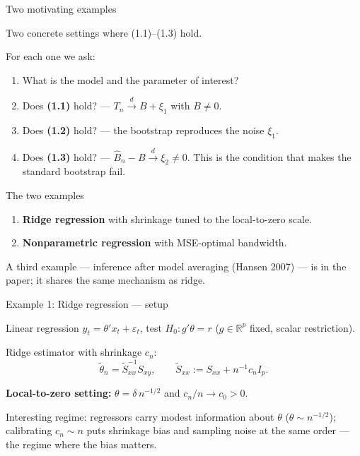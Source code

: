 \documentclass[10pt,aspectratio=169]{beamer}
\theoremstyle{plain}
\newcommand{\R}{\mathbb{R}}
\newcommand{\dto}{\xrightarrow{d}}
\newcommand{\Tn}{T_{n}}
\newcommand{\Bnh}{\hat{B}_{n}}
\begin{document}
\begin{frame}{Two motivating examples}

  Two concrete settings where (1.1)--(1.3) hold.

  \medskip

  For each one we ask:
  \begin{enumerate}
    \setlength{\itemsep}{6pt}
    \item What is the model and the parameter of interest?
    \item Does \textbf{(1.1)} hold? --- $\Tn \dto B + \xi_1$ with $B\neq 0$.
    \item Does \textbf{(1.2)} hold? --- the bootstrap reproduces the noise $\xi_1$.
    \item Does \textbf{(1.3)} hold? --- $\Bnh - B \dto \xi_2 \neq 0$.
      \alert{This is the condition that makes the standard bootstrap fail.}
  \end{enumerate}

  \bigskip

  \begin{block}{The two examples}
    \begin{enumerate}
      \setlength{\itemsep}{2pt}
      \item \textbf{Ridge regression} with shrinkage tuned to the local-to-zero scale.
      \item \textbf{Nonparametric regression} with MSE-optimal bandwidth.
    \end{enumerate}
    \footnotesize
    A third example --- inference after model averaging (Hansen 2007) --- is in
    the paper; it shares the same mechanism as ridge.
  \end{block}

\end{frame}


\begin{frame}{Example 1: Ridge regression --- setup}

  Linear regression $y_t = \theta'x_t + \varepsilon_t$, test $H_0: g'\theta = r$
  \;($g\in\R^p$ fixed, scalar restriction).

  \medskip

  Ridge estimator with shrinkage $c_n$:
  \[
    \tilde\theta_n = \tilde S_{xx}^{-1} S_{xy},
    \qquad \tilde S_{xx} := S_{xx} + n^{-1} c_n I_p.
  \]

  \medskip

  \textbf{Local-to-zero setting:} $\theta = \delta\, n^{-1/2}$ and $c_n / n \to c_0 > 0$.

  \medskip

  \footnotesize
  Interesting regime: regressors carry modest information about $\theta$
  ($\theta\sim n^{-1/2}$); calibrating $c_n \sim n$ puts \alert{shrinkage bias and
  sampling noise at the same order} --- the regime where the bias matters.

\end{frame}
\end{document}
